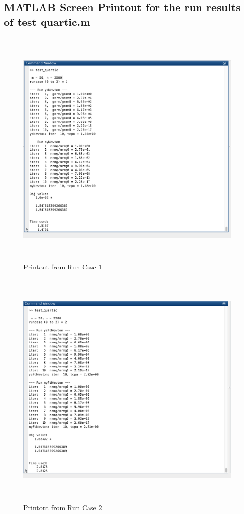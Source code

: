 \subsection{MATLAB Screen Printout for the run results of \textrm{test quartic.m}}
\begin{figure}[H]
\centering
\includegraphics[height=12cm]{p_8}
\caption{Printout from Run Case $1$}
\end{figure}
\begin{figure}[H]
\centering
\includegraphics[height=12cm]{p_9}
\caption{Printout from Run Case $2$}
\end{figure}
